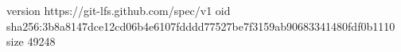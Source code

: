 version https://git-lfs.github.com/spec/v1
oid sha256:3b8a8147dce12cd06b4e6107fdddd77527be7f3159ab90683341480fdf0b1110
size 49248
